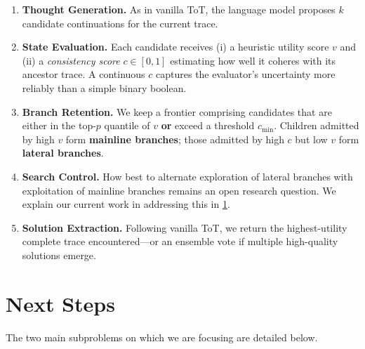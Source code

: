 \documentclass[onecolumn]{IEEEtran}
\begin{document}
\begin{enumerate}
   \item
      \textbf{Thought Generation.}
      As in vanilla ToT, the language model proposes $k$ candidate continuations for the current trace.
   \item
      \textbf{State Evaluation.}
      Each candidate receives (i) a heuristic utility score $v$ and (ii) a \textit{consistency score} $c \in [0, 1]$ estimating how well it coheres with its ancestor trace.
      A continuous $c$ captures the evaluator's uncertainty more reliably than a simple binary boolean.
   \item
      \textbf{Branch Retention.}
      We keep a frontier comprising candidates that are either in the top-$p$ quantile of $v$ \textbf{or} exceed a threshold $c_{\text{min}}$.
      Children admitted by high $v$ form \textbf{mainline branches}; those admitted by high $c$ but low $v$ form \textbf{lateral branches}.
   \item
      \textbf{Search Control.}
      How best to alternate exploration of lateral branches with exploitation of mainline branches remains an open research question.
      We explain our current work in addressing this in \ref{section:next-steps}.
   \item
      \textbf{Solution Extraction.}
      Following vanilla ToT, we return the highest-utility complete trace encountered---or an ensemble vote if multiple high-quality solutions emerge.
\end{enumerate}


\section{Next Steps}
\label{section:next-steps}
The two main subproblems on which we are focusing are detailed below.
\end{document}
